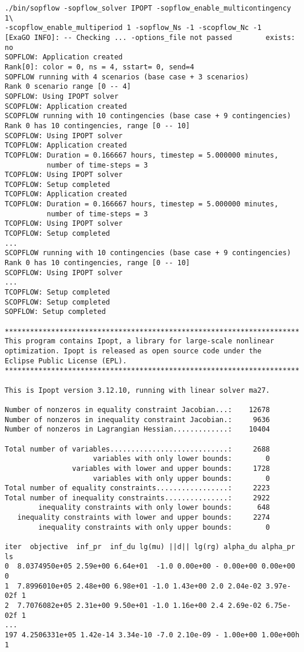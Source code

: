 \begin{lstlisting}
./bin/sopflow -sopflow_solver IPOPT -sopflow_enable_multicontingency 1\
-scopflow_enable_multiperiod 1 -sopflow_Ns -1 -scopflow_Nc -1
[ExaGO INFO]: -- Checking ... -options_file not passed        exists: no
SOPFLOW: Application created
Rank[0]: color = 0, ns = 4, sstart= 0, send=4
SOPFLOW running with 4 scenarios (base case + 3 scenarios)
Rank 0 scenario range [0 -- 4]
SOPFLOW: Using IPOPT solver
SCOPFLOW: Application created
SCOPFLOW running with 10 contingencies (base case + 9 contingencies)
Rank 0 has 10 contingencies, range [0 -- 10]
SCOPFLOW: Using IPOPT solver
TCOPFLOW: Application created
TCOPFLOW: Duration = 0.166667 hours, timestep = 5.000000 minutes, 
          number of time-steps = 3
TCOPFLOW: Using IPOPT solver
TCOPFLOW: Setup completed
TCOPFLOW: Application created
TCOPFLOW: Duration = 0.166667 hours, timestep = 5.000000 minutes, 
          number of time-steps = 3
TCOPFLOW: Using IPOPT solver
TCOPFLOW: Setup completed
...
SCOPFLOW running with 10 contingencies (base case + 9 contingencies)
Rank 0 has 10 contingencies, range [0 -- 10]
SCOPFLOW: Using IPOPT solver
...
TCOPFLOW: Setup completed
SCOPFLOW: Setup completed
SOPFLOW: Setup completed

**********************************************************************
This program contains Ipopt, a library for large-scale nonlinear 
optimization. Ipopt is released as open source code under the 
Eclipse Public License (EPL).
**********************************************************************

This is Ipopt version 3.12.10, running with linear solver ma27.

Number of nonzeros in equality constraint Jacobian...:    12678
Number of nonzeros in inequality constraint Jacobian.:     9636
Number of nonzeros in Lagrangian Hessian.............:    10404

Total number of variables............................:     2688
                     variables with only lower bounds:        0
                variables with lower and upper bounds:     1728
                     variables with only upper bounds:        0
Total number of equality constraints.................:     2223
Total number of inequality constraints...............:     2922
        inequality constraints with only lower bounds:      648
   inequality constraints with lower and upper bounds:     2274
        inequality constraints with only upper bounds:        0

iter  objective  inf_pr  inf_du lg(mu) ||d|| lg(rg) alpha_du alpha_pr  ls
0  8.0374950e+05 2.59e+00 6.64e+01  -1.0 0.00e+00 - 0.00e+00 0.00e+00   0
1  7.8996010e+05 2.48e+00 6.98e+01 -1.0 1.43e+00 2.0 2.04e-02 3.97e-02f 1
2  7.7076082e+05 2.31e+00 9.50e+01 -1.0 1.16e+00 2.4 2.69e-02 6.75e-02f 1
...
197 4.2506331e+05 1.42e-14 3.34e-10 -7.0 2.10e-09 - 1.00e+00 1.00e+00h  1


\end{lstlisting}
